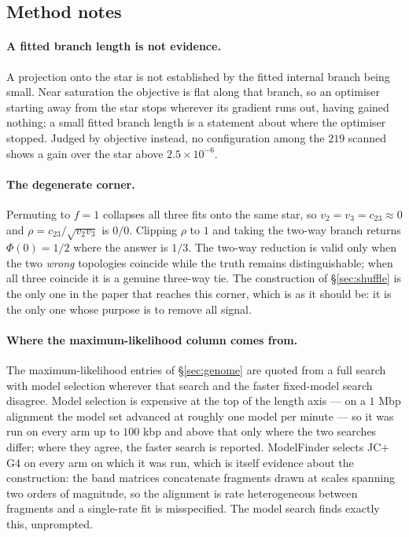 \documentclass[preprint,12pt,authoryear]{elsarticle}
\theoremstyle{definition}
\theoremstyle{remark}
\begin{document}
\subsection{Method notes}
\label{sec:notes}

\paragraph{A fitted branch length is not evidence.} A projection onto the star
is not established by the fitted internal branch being small. Near saturation
the objective is flat along that branch, so an optimiser starting away from
the star stops wherever its gradient runs out, having gained nothing; a small
fitted branch length is a statement about where the optimiser stopped. Judged
by objective instead, no configuration among the $219$ scanned shows a gain
over the star above $2.5\times10^{-6}$.

\paragraph{The degenerate corner.} Permuting to $f=1$ collapses all three
fits onto the same star, so $v_2=v_3=c_{23}\approx0$ and
$\rho=c_{23}/\sqrt{v_2v_3}$ is $0/0$. Clipping $\rho$ to $1$ and taking the
two-way branch returns $\Phi(0)=1/2$ where the answer is $1/3$. The two-way
reduction is valid only when the two \emph{wrong} topologies coincide while
the truth remains distinguishable; when all three coincide it is a genuine
three-way tie. The construction of \S\ref{sec:shuffle} is the only one in the
paper that reaches this corner, which is as it should be: it is the only one
whose purpose is to remove all signal.

\paragraph{Where the maximum-likelihood column comes from.} The
maximum-likelihood entries of \S\ref{sec:genome} are quoted from a full search
with model selection wherever that search and the faster fixed-model search
disagree. Model selection is expensive at the top of the length axis --- on a
$1$ Mbp alignment the model set advanced at roughly one model per minute --- so
it was run on every arm up to $100$ kbp and above that only where the two
searches differ; where they agree, the faster search is reported. ModelFinder
selects JC$+$G4 on every arm on which it was run, which is itself evidence
about the construction: the band matrices concatenate fragments drawn at
scales spanning two orders of magnitude, so the alignment is rate
heterogeneous between fragments and a single-rate fit is misspecified. The
model search finds exactly this, unprompted.




\end{document}
